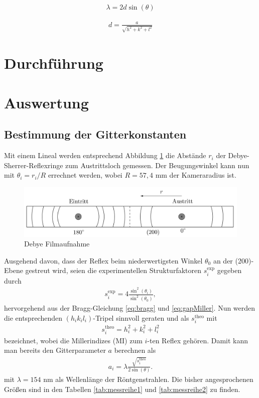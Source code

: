 \begin{align}
 \lambda = 2 d \sin(\theta)
 \label{eq:bragg}
\end{align}

\begin{align}
 d = \frac{a}{\sqrt{h^2 + k^2 + l^2}}
 \label{eq:gapMiller}
\end{align}




\section{Durchführung}


\section{Auswertung}
\subsection{Bestimmung der Gitterkonstanten}

Mit einem Lineal werden entsprechend Abbildung \ref{pic:debyefilm} die Abstände $r_i$ der Debye-Sherrer-Reflexringe zum Austrittsloch gemessen. Der 
Beugungswinkel kann nun mit $\theta_i = r_i/R$ errechnet werden, wobei $R=57,4$ mm der Kameraradius ist. 
\begin{figure}[H]
 \includegraphics[width=\textwidth]{../pics/debyestreifen.jpg}
 \caption{Debye Filmaufnahme}
 \label{pic:debyefilm}
\end{figure}
\noindent Ausgehend davon, dass der Reflex beim niederwertigsten
Winkel $\theta_0$ an der (200)-Ebene gestreut wird, seien die experimentellen Strukturfaktoren $s^\text{exp}_i$ gegeben durch
\begin{align}
 s^\text{exp}_i = 4\frac{\sin^2(\theta_i)}{\sin^2(\theta_0)},
 \label{eq:structExp}
\end{align}
hervorgehend aus der Bragg-Gleichung \eqref{eq:bragg} und \eqref{eq:gapMiller}. Nun werden die entsprechenden $(h_ik_il_i)$-Tripel sinnvoll geraten und als 
$s^\text{theo}_i$ mit
\begin{align}
 s^\text{theo}_i = h_i^2 + k_i^2 + l_i^2
 \label{eq:structTheo}
\end{align}
bezeichnet, wobei die Millerindizes (MI) zum $i$-ten Reflex gehören. Damit kann man bereits den Gitterparameter $a$ berechnen als
\begin{align}
 a_i = \lambda\frac{\sqrt{s^\text{theo}_i}}{2\sin(\theta)}.
 \label{eq:gitterparameter}
\end{align}
mit $\lambda=154$ nm als Wellenlänge der Röntgenstrahlen. Die bisher angesprochenen Größen sind in den Tabellen \ref{tab:messreihe1} und \ref{tab:messreihe2} zu finden.

